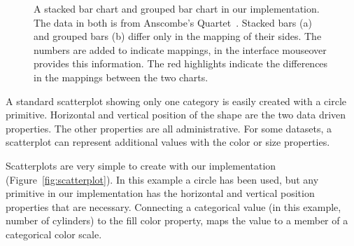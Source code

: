 \begin{figure}[t]
\centering
\hfill
{}
\hfill
{}
\caption{A stacked bar chart and grouped bar chart in our implementation.
The data in both is from Anscombe's Quartet~\cite{Anscombe1973}.
Stacked bars (a) and grouped bars (b) differ only in the mapping of their sides.
The numbers are added to indicate mappings, in the interface mouseover provides this information.
The red highlights indicate the differences in the mappings between the two charts.
}
\label{fig:barCharts}
\end{figure}

\label{scatterplot}

A standard scatterplot showing only one category is easily created with a circle primitive.
Horizontal and vertical position of the shape are the two data driven properties.
The other properties are all administrative.
For some datasets, a scatterplot can represent additional values with the color or size properties.

Scatterplots are very simple to create with our implementation (Figure~\ref{fig:scatterplot}).
In this example a circle has been used, but any primitive in our implementation has the horizontal and vertical position properties that are necessary.
Connecting a categorical value (in this example, number of cylinders) to the fill color property, maps the value to a member of a categorical color scale.

